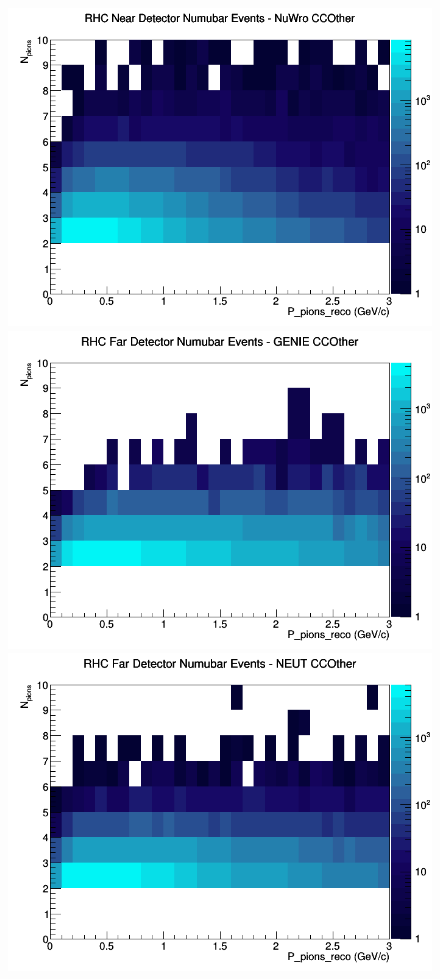 \documentclass[12pt]{article}
\begin{document}
\begin{figure}[h]
\includegraphics[width=\linewidth]{eff_N_P/GAr/pions/CCOther_RHC_ND_numubar_N_P_NuWro.png}
\endminipage
\newline
{}
\includegraphics[width=\linewidth]{eff_N_P/GAr/pions/CCOther_RHC_FD_numubar_N_P_GENIE.png}
\endminipage
{}
\includegraphics[width=\linewidth]{eff_N_P/GAr/pions/CCOther_RHC_FD_numubar_N_P_NEUT.png}

\end{figure}
\end{document}
